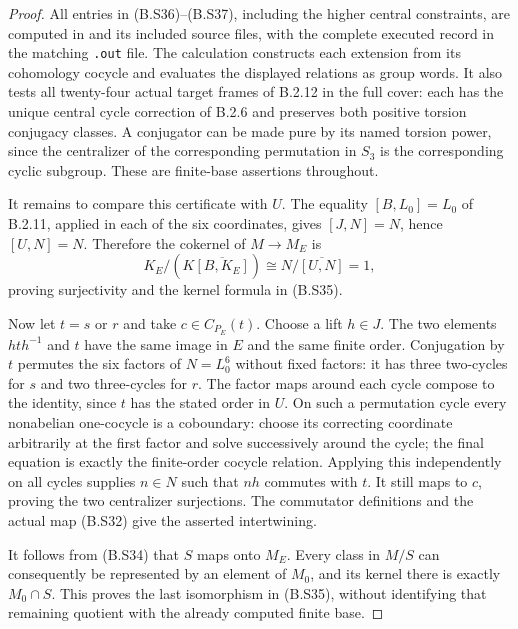\begin{proof}
All entries in (B.S36)--(B.S37), including the
higher central constraints, are computed in
and its included source files, with the complete
executed record in the matching \texttt{.out} file.
The calculation constructs each extension from its
cohomology cocycle and evaluates the displayed
relations as group words.  It also tests all twenty-four
actual target frames of B.2.12 in the full cover:
each has the unique central cycle correction of
B.2.6 and preserves both positive torsion conjugacy
classes.  A conjugator can be made pure by its named
torsion power, since the centralizer of the corresponding
permutation in $S_3$ is the corresponding cyclic
subgroup.  These are finite-base assertions throughout.

It remains to compare this certificate with $U$.
The equality $[B,L_0]=L_0$ of B.2.11, applied in each
of the six coordinates, gives $[J,N]=N$, hence
$[U,N]=N$.  Therefore the cokernel of $M\to M_E$ is
\[
 K_E/(K\overline{[B,K_E]})
                     \cong N/\overline{[U,N]}=1,
\]
proving surjectivity and the kernel formula in (B.S35).

Now let $t=s$ or $r$ and take $c\in C_{P_E}(t)$.
Choose a lift $h\in J$.  The two elements $hth^{-1}$
and $t$ have the same image in $E$ and the same
finite order.  Conjugation by $t$ permutes the six
factors of $N=L_0^6$ without fixed factors: it has
three two-cycles for $s$ and two three-cycles for $r$.
The factor maps around each cycle compose to the
identity, since $t$ has the stated order in $U$.
On such a permutation cycle every nonabelian
one-cocycle is a coboundary: choose its correcting
coordinate arbitrarily at the first factor and
solve successively around the cycle; the final
equation is exactly the finite-order cocycle relation.
Applying this independently on all cycles supplies
$n\in N$ such that $nh$ commutes with $t$.
It still maps to $c$, proving the two centralizer
surjections.  The commutator definitions and the
actual map (B.S32) give the asserted intertwining.

It follows from (B.S34) that $S$ maps onto $M_E$.
Every class in $M/S$ can consequently be represented
by an element of $M_0$, and its kernel there is
exactly $M_0\cap S$.  This proves the last isomorphism
in (B.S35), without identifying that remaining
quotient with the already computed finite base.
\end{proof}
